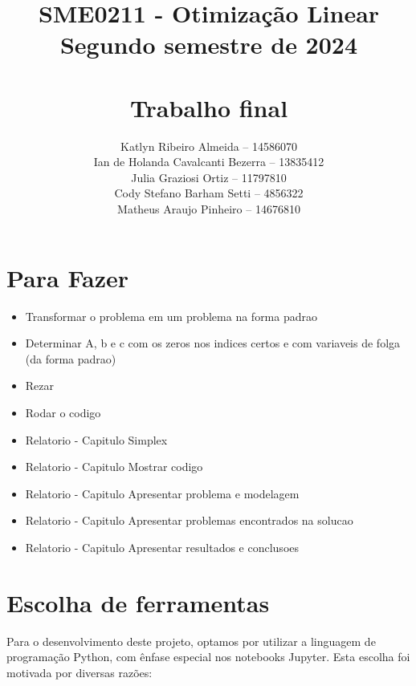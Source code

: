 \documentclass{article}
\title{SME0211 - Otimização Linear\\
Segundo semestre de 2024\\ 

\textbf{\\Trabalho final}}
\author{
Katlyn Ribeiro Almeida -- 14586070\\
Ian de Holanda Cavalcanti Bezerra -- 13835412 \\
Julia Graziosi Ortiz -- 11797810\\
Cody Stefano Barham Setti -- 4856322\\
Matheus Araujo Pinheiro -- 14676810
}
\begin{document}
\maketitle
\section{Para Fazer}

\begin{itemize}
    \item Transformar o problema em um problema na forma padrao
    \item Determinar A, b e c com os zeros nos indices certos e com variaveis de folga (da forma padrao)
    \item Rezar
    \item Rodar o codigo
    \item Relatorio - Capitulo Simplex
    \item Relatorio - Capitulo Mostrar codigo
    \item Relatorio - Capitulo Apresentar problema e modelagem
    \item Relatorio - Capitulo Apresentar problemas encontrados na solucao
    \item Relatorio - Capitulo Apresentar resultados e conclusoes
\end{itemize}






\section{Escolha de ferramentas}

Para o desenvolvimento deste projeto, optamos por utilizar a linguagem de programação Python, com ênfase especial nos notebooks Jupyter. Esta escolha foi motivada por diversas razões:
\end{document}
